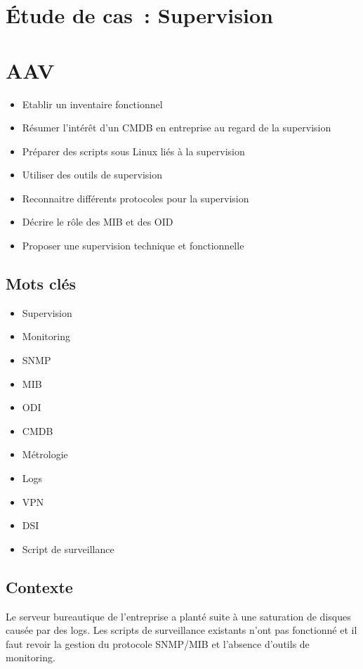 \newpage
\section*{Étude de cas~: Supervision}

\section*{AAV}
\begin{itemize}
	\item [3] Etablir un inventaire fonctionnel
  \item [2] Résumer l'intérêt d'un CMDB en entreprise au regard de la supervision
  \item [3] Préparer des scripts sous Linux liés à la supervision
  \item [3] Utiliser des outils de supervision
  \item [2] Reconnaitre différents protocoles pour la supervision
  \item [2] Décrire le rôle des MIB et des OID
  \item [5] Proposer une supervision technique et fonctionnelle
\end{itemize}

\newpage

\subsection*{Mots clés}
{}
\begin{itemize}
	\item Supervision
	\item Monitoring
	\item SNMP
	\item MIB
	\item ODI
	\item CMDB
	\item Métrologie
	\item Logs
	\item VPN
	\item DSI 
	\item Script de surveillance
\end{itemize}

\subsection*{Contexte}
{}
\noindent Le serveur bureautique de l'entreprise a planté suite à une saturation de disques causée par des logs. Les scripts de surveillance existants n'ont pas fonctionné et il faut revoir la gestion du protocole SNMP/MIB et l'absence d'outils de monitoring.

